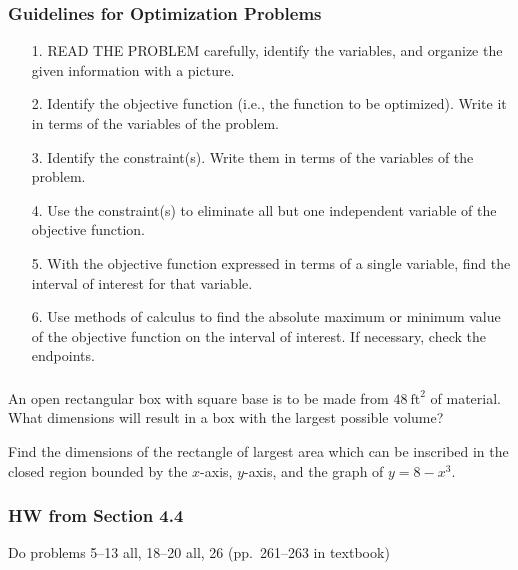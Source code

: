 \documentclass[14pt]{beamer}
\begin{document}
\begin{frame}
\frametitle{\small Guidelines for Optimization Problems}
\footnotesize
\begin{itemize}
\item[1.] \alert{READ THE PROBLEM} carefully, identify the variables, and organize the given information with a picture.
\item[2.] Identify the objective function (i.e., the function to be optimized).  Write it in terms of the variables of the problem.
\item[3.] Identify the constraint(s).  Write them in terms of the variables of the problem.
\item[4.] Use the constraint(s) to eliminate all but one independent variable of the objective function.  
\item[5.] With the objective function expressed in terms of a single variable, find the interval of interest for that variable.
\item[6.] Use methods of calculus to find the absolute maximum or minimum value of the objective function on the interval of interest.  If necessary, \alert{check the endpoints}.
\end{itemize}
\end{frame}

\begin{frame}%
\frametitle{}
\small
\begin{exe} An open rectangular box with square base is to be made from $48\ \text{ft}^2$ of material.  What dimensions will result in a box with the largest possible volume? \end{exe}

\vspace{1pc}
\begin{exe} Find the dimensions of the rectangle of largest area which can be inscribed in the closed region bounded by the $x$-axis, $y$-axis, and the graph of $y=8-x^3$. \end{exe}
\end{frame}

\begin{frame}
\frametitle{HW from Section 4.4}
Do problems 5--13 all, 18--20 all, 26 (pp.\ 261--263 in textbook)
\end{frame}


\begin{comment}
\end{comment}
\end{document}
